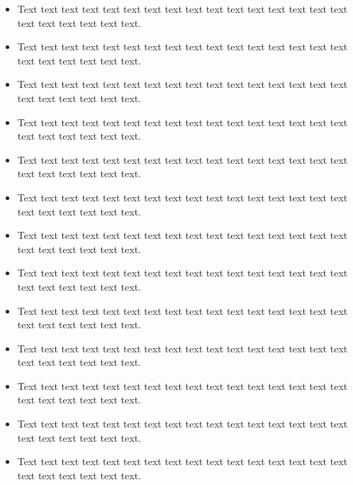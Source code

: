 \documentclass[a4paper,11pt]{article}
\begin{document}
\begin{itemize}
	
	\item Text text text text text text text text text text text text text text text text text text text text text text.
	\item Text text text text text text text text text text text text text text text text text text text text text text.
	\item Text text text text text text text text text text text text text text text text text text text text text text.
	\item Text text text text text text text text text text text text text text text text text text text text text text.
	\item Text text text text text text text text text text text text text text text text text text text text text text.
	\item Text text text text text text text text text text text text text text text text text text text text text text.
	\item Text text text text text text text text text text text text text text text text text text text text text text.
	\item Text text text text text text text text text text text text text text text text text text text text text text.
	\item Text text text text text text text text text text text text text text text text text text text text text text.
	\item Text text text text text text text text text text text text text text text text text text text text text text.
	\item Text text text text text text text text text text text text text text text text text text text text text text.
	\item Text text text text text text text text text text text text text text text text text text text text text text.
	\item Text text text text text text text text text text text text text text text text text text text text text text.

\end{itemize}
\end{document}
